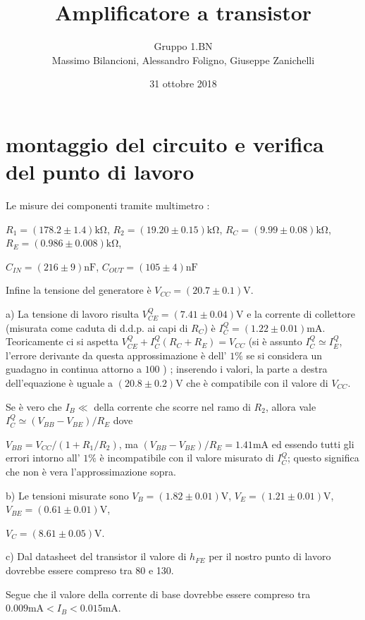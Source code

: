 \documentclass[10pt,a4paper]{article}
\author{Gruppo 1.BN \\ Massimo Bilancioni, Alessandro Foligno, Giuseppe Zanichelli }
\title{Amplificatore a transistor}
\begin{document}
\date{31 ottobre 2018}
\maketitle
\section{montaggio del circuito e verifica del punto di lavoro}

Le misure dei componenti tramite multimetro :

$ R_1 = (178.2\pm 1.4)\si{\kilo\ohm}$, $ R_2 = (19.20\pm 0.15)\si{\kilo\ohm}$, $ R_C = (9.99\pm 0.08)\si{\kilo\ohm}$, $ R_E = (0.986\pm 0.008)\si{\kilo\ohm}$,

 $ C_{IN} = (216 \pm 9)\si{\nano\farad}$, $ C_{OUT} = (105\pm 4)\si{\nano\farad}$

Infine la tensione del generatore è  $V_{CC} = (20.7\pm 0.1)\si{\volt}$.


a) La tensione  di lavoro risulta  $V_{CE}^Q = (7.41 \pm 0.04) \si{\volt}$ e  la corrente di collettore (misurata come caduta di d.d.p. ai capi di $R_C$) è $I_C^Q = (1.22\pm 0.01) \si{\milli\ampere}$. 
Teoricamente ci si aspetta  $V_{CE}^Q + I_C^Q(R_C+ R_E)= V_{CC}$  (si è assunto $I_C^Q \simeq I_E^Q$, l'errore derivante  da questa approssimazione è dell' $1 \%$ se si considera un guadagno in continua attorno a $100$ )
; inserendo i valori, la parte a destra dell'equazione è uguale a $(20.8\pm 0.2)\si{\volt}$ che è compatibile con il valore di $V_{CC}$.

Se è vero che  $I_B \ll$ della corrente che scorre nel ramo di $R_2$, allora vale $I_C^Q \simeq (V_{BB}-V_{BE})/R_E$ dove            

$V_{BB}= V_{CC}/(1+ R_1/R_2)$, ma $(V_{BB}-V_{BE})/R_E= 1.41 \si{\milli\ampere}$ ed essendo tutti gli errori intorno all' $1\%$ è incompatibile con il valore misurato di $I_C^Q$; questo significa che non è vera l'approssimazione sopra.


b) Le tensioni misurate sono $V_B = (1.82\pm 0.01)\si{\volt}$,  $V_E = (1.21\pm 0.01)\si{\volt}$,  $V_{BE} = (0.61\pm 0.01)\si{\volt}$, 

 $V_C = (8.61\pm 0.05)\si{\volt}$.

c) Dal datasheet del transistor il valore di $h_{FE}$ per il nostro punto di lavoro dovrebbe essere compreso tra 80 e 130.

Segue che il valore della corrente di base dovrebbe essere compreso tra $0.009\si{\milli\ampere} < I_B< 0.015\si{\milli\ampere} $.
\end{document}
